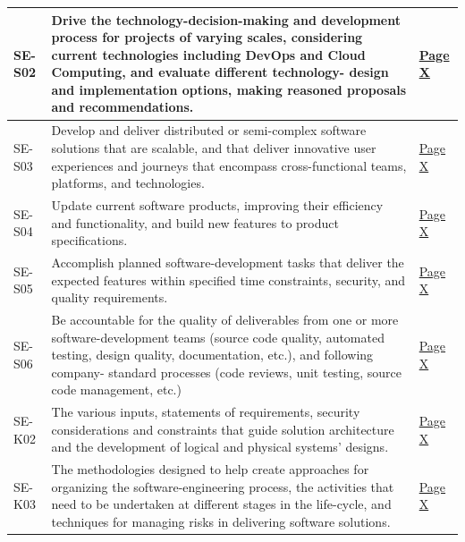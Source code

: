\begin{longtable}{|p{2.5cm}|p{10cm}|p{1.5cm}|}
      SE-S02              & Drive the technology-decision-making and development process for
                            projects of varying scales, considering current technologies including
                            DevOps and Cloud Computing, and evaluate different technology-
                            design and implementation options, making reasoned proposals and
                            recommendations. & \hyperref[sec:cicd]{Page X} \\ \hline

      SE-S03              & Develop and deliver distributed or semi-complex software solutions
                            that are scalable, and that deliver innovative user experiences and
                            journeys that encompass cross-functional teams, platforms, and technologies. & \hyperref[sec:cicd]{Page X} \\ \hline

      SE-S04              & Update current software products, improving their efficiency and
                            functionality, and build new features to product specifications. & \hyperref[sec:cicd]{Page X} \\ \hline

      SE-S05              & Accomplish planned software-development tasks that deliver the expected
                            features within specified time constraints, security, and quality requirements. & \hyperref[sec:cicd]{Page X} \\ \hline

      SE-S06              & Be accountable for the quality of deliverables from one or more
                            software-development teams (source code quality, automated testing,
                            design quality, documentation, etc.), and following company-
                            standard processes (code reviews, unit testing, source code management, etc.)  & \hyperref[sec:cicd]{Page X} \\ \hline

      SE-K02              & The various inputs, statements of requirements, security considerations
                            and constraints that guide solution architecture and the development
                            of logical and physical systems' designs. & \hyperref[sec:cicd]{Page X} \\ \hline

      SE-K03              & The methodologies designed to help create approaches for organizing
                            the software-engineering process, the activities that need to be
                            undertaken at different stages in the life-cycle, and techniques for
                            managing risks in delivering software solutions. & \hyperref[sec:cicd]{Page X} \\ \hline


\end{longtable}
